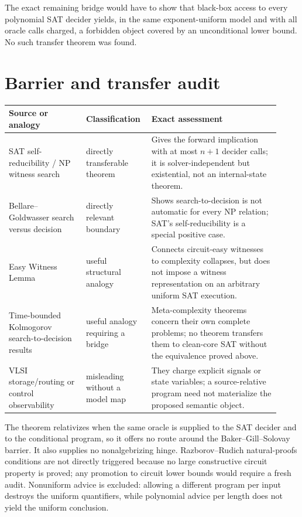 \documentclass[11pt]{article}
\begin{document}
The exact remaining bridge would have to show that black-box access to every polynomial SAT decider yields, in the same exponent-uniform model and with all oracle calls charged, a forbidden object covered by an unconditional lower bound.  No such transfer theorem was found.

\section{Barrier and transfer audit}

\begin{center}
\begin{tabular}{p{0.27\linewidth}p{0.20\linewidth}p{0.45\linewidth}}
\toprule
Source or analogy & Classification & Exact assessment \\
\midrule
SAT self-reducibility / NP witness search & directly transferable theorem & Gives the forward implication with at most $n+1$ decider calls; it is solver-independent but existential, not an internal-state theorem. \\
Bellare--Goldwasser search versus decision & directly relevant boundary & Shows search-to-decision is not automatic for every NP relation; SAT's self-reducibility is a special positive case. \\
Easy Witness Lemma & useful structural analogy & Connects circuit-easy witnesses to complexity collapses, but does not impose a witness representation on an arbitrary uniform SAT execution. \\
Time-bounded Kolmogorov search-to-decision results & useful analogy requiring a bridge & Meta-complexity theorems concern their own complete problems; no theorem transfers them to clean-core SAT without the equivalence proved above. \\
VLSI storage/routing or control observability & misleading without a model map & They charge explicit signals or state variables; a source-relative program need not materialize the proposed semantic object. \\
\bottomrule
\end{tabular}
\end{center}

The theorem relativizes when the same oracle is supplied to the SAT decider and to the conditional program, so it offers no route around the Baker--Gill--Solovay barrier.  It also supplies no nonalgebrizing hinge.  Razborov--Rudich natural-proofs conditions are not directly triggered because no large constructive circuit property is proved; any promotion to circuit lower bounds would require a fresh audit.  Nonuniform advice is excluded: allowing a different program per input destroys the uniform quantifiers, while polynomial advice per length does not yield the uniform conclusion.
\end{document}

